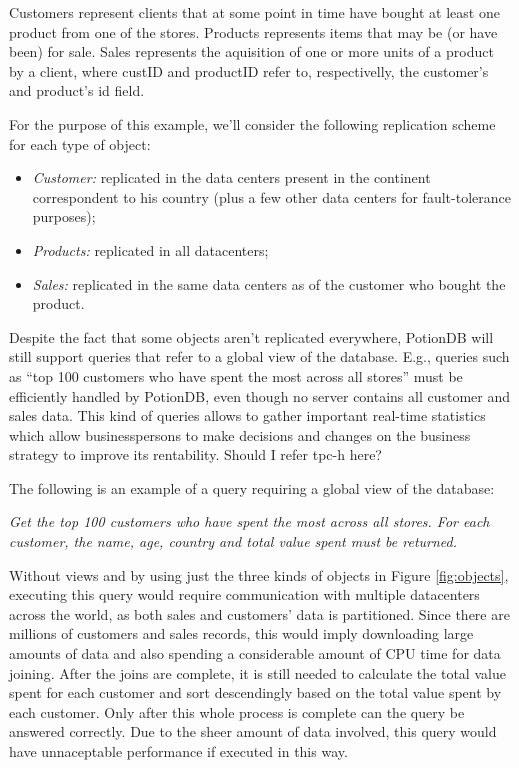 \documentclass{vldb}
\newcommand{\grumbler}[2]{{\color{red}{\bf #1:} #2}}
\newcommand{\andre}[1]{\grumbler{andre}{#1}}
\newcommand{\emphvspace}{0.5\baselineskip}
\newcommand{\lineemph}[1]{\vspace{\emphvspace}\hspace{2em}\emph{#1}\vspace{\emphvspace}}
\begin{document}
Customers represent clients that at some point in time have bought at least one product from one of the stores.
Products represents items that may be (or have been) for sale.
Sales represents the aquisition of one or more units of a product by a client, where custID and productID refer to, respectivelly, the customer's and product's id field.

For the purpose of this example, we'll consider the following replication scheme for each type of object:
\begin{itemize}
	\item \emph{Customer:} replicated in the data centers present in the continent correspondent to his country (plus a few other data centers for fault-tolerance purposes);
	\item \emph{Products:} replicated in all datacenters;
	\item \emph{Sales:} replicated in the same data centers as of the customer who bought the product. 
\end{itemize}

Despite the fact that some objects aren't replicated everywhere, PotionDB will still support queries that refer to a global view of the database.
E.g., queries such as ``top 100 customers who have spent the most across all stores'' must be efficiently handled by PotionDB, even though no server contains all customer and sales data. 
This kind of queries allows to gather important real-time statistics which allow businesspersons to make decisions and changes on the business strategy to improve its rentability.
\andre{Should I refer tpc-h here?}

The following is an example of a query requiring a global view of the database:

\lineemph{Get the top 100 customers who have spent the most across all stores. For each customer, the name, age, country and total value spent must be returned.}

Without views and by using just the three kinds of objects in Figure \ref{fig:objects}, executing this query would require communication with multiple datacenters across the world, as both sales and customers' data is partitioned.
Since there are millions of customers and sales records, this would imply downloading large amounts of data and also spending a considerable amount of CPU time for data joining.
After the joins are complete, it is still needed to calculate the total value spent for each customer and sort descendingly based on the total value spent by each customer.
Only after this whole process is complete can the query be answered correctly.
Due to the sheer amount of data involved, this query would have unnaceptable performance if executed in this way.
\end{document}
